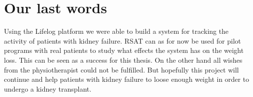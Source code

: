 \documentclass{cslthse-msc}
\begin{document}
 





\section{Our last words}

Using the Lifelog platform we were able to build a system for tracking the activity of patients with kidney failure. RSAT can as for now be used for pilot programs with real patients to study what effects the system has on the weight loss. This can be seen as a success for this thesis. On the other hand all wishes from the physiotherapist could not be fulfilled. But hopefully this project will continue and help patients with kidney failure to loose enough weight in order to undergo a kidney transplant.



   
\end{document}
